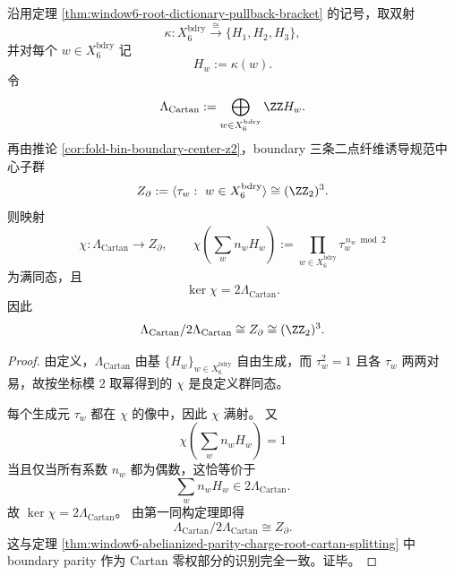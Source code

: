 \begin{proposition}\label{prop:conclusion-window6-cartan-lattice-mod2-boundary-parity}
沿用定理 \ref{thm:window6-root-dictionary-pullback-bracket} 的记号，取双射
\[
\kappa:X_6^{\mathrm{bdry}}\overset{\cong}{\longrightarrow}\{H_1,H_2,H_3\},
\]
并对每个 \(w\in X_6^{\mathrm{bdry}}\) 记
\[
H_w:=\kappa(w).
\]
令
\[
\Lambda_{\mathrm{Cartan}}
:=
\bigoplus_{w\in X_6^{\mathrm{bdry}}}\ZZ H_w.
\]
再由推论 \ref{cor:fold-bin-boundary-center-z2}，boundary 三条二点纤维诱导规范中心子群
\[
Z_{\partial}:=\langle \tau_w:\ w\in X_6^{\mathrm{bdry}}\rangle\cong (\ZZ_2)^3.
\]
则映射
\[
\chi:\Lambda_{\mathrm{Cartan}}\longrightarrow Z_{\partial},
\qquad
\chi\!\left(\sum_{w} n_wH_w\right)
:=
\prod_{w\in X_6^{\mathrm{bdry}}}\tau_w^{\,n_w\bmod 2}
\]
为满同态，且
\[
\ker\chi=2\Lambda_{\mathrm{Cartan}}.
\]
因此
\[
\Lambda_{\mathrm{Cartan}}/2\Lambda_{\mathrm{Cartan}}
\cong
Z_{\partial}
\cong
(\ZZ_2)^3.
\]
\end{proposition}
\begin{proof}
由定义，\(\Lambda_{\mathrm{Cartan}}\) 由基 \(\{H_w\}_{w\in X_6^{\mathrm{bdry}}}\) 自由生成，而 \(\tau_w^2=1\) 且各 \(\tau_w\) 两两对易，故按坐标模 \(2\) 取幂得到的 \(\chi\) 是良定义群同态。

每个生成元 \(\tau_w\) 都在 \(\chi\) 的像中，因此 \(\chi\) 满射。
又
\[
\chi\!\left(\sum_w n_wH_w\right)=1
\]
当且仅当所有系数 \(n_w\) 都为偶数，这恰等价于
\[
\sum_w n_wH_w\in 2\Lambda_{\mathrm{Cartan}}.
\]
故 \(\ker\chi=2\Lambda_{\mathrm{Cartan}}\)。
由第一同构定理即得
\[
\Lambda_{\mathrm{Cartan}}/2\Lambda_{\mathrm{Cartan}}\cong Z_{\partial}.
\]
这与定理 \ref{thm:window6-abelianized-parity-charge-root-cartan-splitting} 中 boundary parity 作为 Cartan 零权部分的识别完全一致。证毕。
\end{proof}

